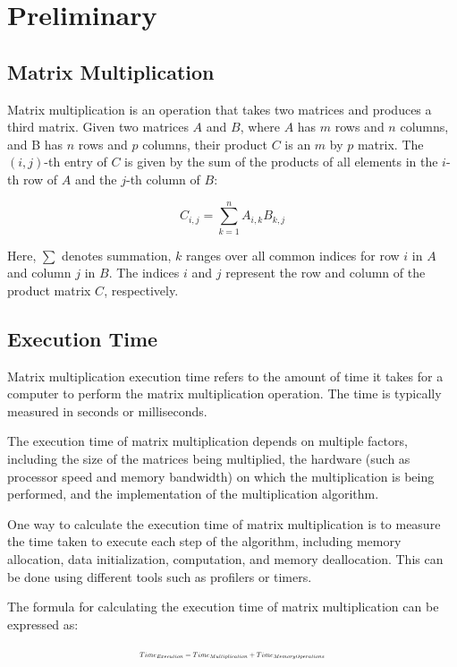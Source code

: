 \documentclass[conference]{IEEEtran}
\begin{document}
	\section{Preliminary}
	\subsection{Matrix Multiplication}
	Matrix multiplication is an operation that takes two matrices and produces a third matrix. Given two matrices $A$ and $B$, where $A$ has $m$ rows and $n$ columns, and B has $n$ rows and $p$ columns, their product $C$ is an $m$ by $p$ matrix. The $(i,j)$-th entry of $C$ is given by the sum of the products of all elements in the $i$-th row of $A$ and the $j$-th column of $B$:
	
	\begin{equation}
		C_{i,j} = \sum_{k=1}^{n} A_{i,k} B_{k,j}
	\end{equation}
	
	
	Here, $\sum$ denotes summation, $k$ ranges over all common indices for row $i$ in $A$ and column $j$ in $B$. The indices $i$ and $j$ represent the row and column of the product matrix $C$, respectively.
	
	\subsection{Execution Time}
	Matrix multiplication execution time refers to the amount of time it takes for a computer to perform the matrix multiplication operation. The time is typically measured in seconds or milliseconds.
	
	The execution time of matrix multiplication depends on multiple factors, including the size of the matrices being multiplied, the hardware (such as processor speed and memory bandwidth) on which the multiplication is being performed, and the implementation of the multiplication algorithm.
	
	One way to calculate the execution time of matrix multiplication is to measure the time taken to execute each step of the algorithm, including memory allocation, data initialization, computation, and memory deallocation. This can be done using different tools such as profilers or timers.
	
	The formula for calculating the execution time of matrix multiplication can be expressed as:
	
	\begin{equation}
		\resizebox{0.44\textwidth}{!}{
			$Time_{Execution} = Time_{Multiplication} + Time_{MemoryOperations}$
		}
	\end{equation}
	
\end{document}
